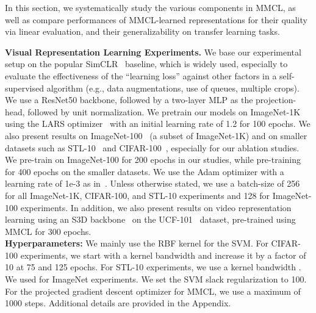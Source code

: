 \documentclass[letterpaper]{article} \usepackage{aaai22}  \usepackage{times}  \usepackage{helvet}  \usepackage{courier}  \usepackage[hyphens]{url}  \usepackage{graphicx} \urlstyle{rm} \def\UrlFont{\rm}  \usepackage{natbib}  \usepackage{caption} \DeclareCaptionStyle{ruled}{labelfont=normalfont,labelsep=colon,strut=off} \frenchspacing  \setlength{\pdfpagewidth}{8.5in}  \setlength{\pdfpageheight}{11in}
\begin{document}
In this section, we systematically study the various components in MMCL, as well as compare performances of MMCL-learned representations for their quality via linear evaluation, and their generalizability on transfer learning tasks.

\noindent \textbf{Visual Representation Learning Experiments.} We base our experimental setup on the popular SimCLR~\cite{chen2020simple} baseline, which is widely used, especially to evaluate the effectiveness of the ``learning loss'' against other factors in a self-supervised algorithm (e.g., data augmentations, use of queues, multiple crops).
We use a ResNet50 backbone, followed by a two-layer MLP as the projection-head, followed by unit normalization. We pretrain our models on ImageNet-1K~\cite{deng2009imagenet} using the LARS optimizer~\cite{you2017large} with an initial learning rate of 1.2 for 100 epochs. We also present results on ImageNet-100~\cite{tian2019contrastive} (a subset of ImageNet-1K) and on smaller datasets such as STL-10~\cite{coates2011analysis} and CIFAR-100~\cite{krizhevsky2009learning}, especially for our ablation studies. We pre-train on ImageNet-100 for 200 epochs in our studies, while pre-training for 400 epochs on the smaller datasets. We use the Adam optimizer with a learning rate of 1e-3 as in~\cite{chuang2020debiased,robinson2021contrastive}. Unless otherwise stated, we use a batch-size of 256 for all ImageNet-1K, CIFAR-100, and STL-10 experiments and 128 for ImageNet-100 experiments. In addition, we also present results on video representation learning using an S3D backbone~\cite{Xie2018RethinkingSF} on the UCF-101~\cite{soomro2012ucf101} dataset, pre-trained using MMCL for 300 epochs. 
\\
\noindent\textbf{Hyperparameters:} 
We mainly use the RBF kernel for the SVM. For CIFAR-100 experiments, we start with a kernel bandwidth  and increase it by a factor of 10 at 75 and 125 epochs. For STL-10 experiments, we use a kernel bandwidth . We used  for ImageNet experiments. 
We set the SVM slack regularization  to 100.  For the projected gradient descent optimizer for MMCL, we use a maximum of 1000 steps. Additional details are provided in the Appendix.
\end{document}

